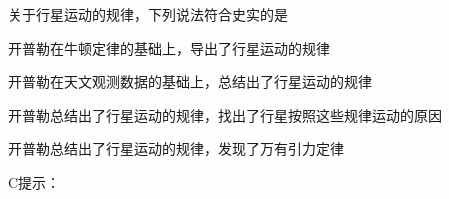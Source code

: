 	关于行星运动的规律，下列说法符合史实的是\paren[]
\begin{choices}
	\item 开普勒在牛顿定律的基础上，导出了行星运动的规律
	\item 开普勒在天文观测数据的基础上，总结出了行星运动的规律
	\item 开普勒总结出了行星运动的规律，找出了行星按照这些规律运动的原因
	\item 开普勒总结出了行星运动的规律，发现了万有引力定律
\end{choices}
\begin{answer}
	C\qquad 提示：	
\end{answer}